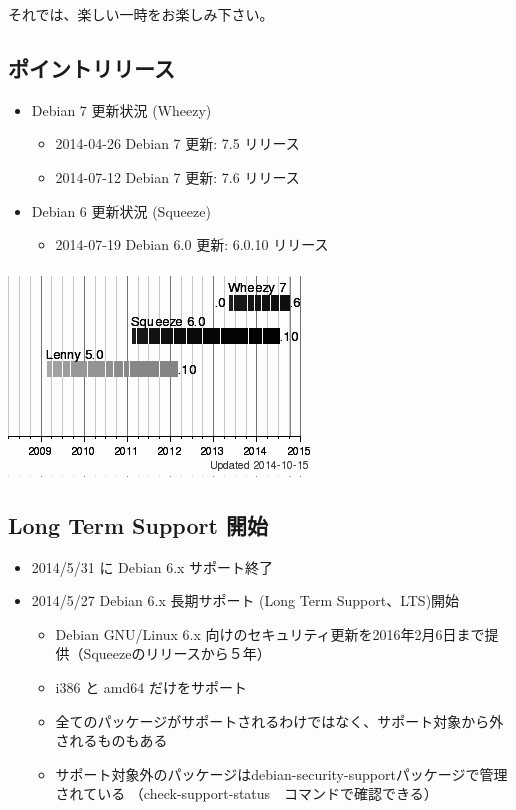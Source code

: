 \documentclass[mingoth,a4paper]{jsarticle}
\begin{document}
 それでは、楽しい一時をお楽しみ下さい。

\subsection{ポイントリリース}

\begin{itemize}
\item Debian 7 更新状況 (Wheezy)
\begin{itemize}
\item 2014-04-26 Debian 7 更新: 7.5 リリース
\item 2014-07-12 Debian 7 更新: 7.6 リリース
\end{itemize}
\item Debian 6 更新状況 (Squeeze)
\begin{itemize}
\item 2014-07-19 Debian 6.0 更新: 6.0.10 リリース
\end{itemize}
\end{itemize}

\begin{center}
\includegraphics[scale=0.7]{image201410/debian-release-201410-cut_mono.png}
\end{center}



\subsection[containsverbatim]{Long Term Support 開始}
\begin{itemize}
\item 2014/5/31 に Debian 6.x サポート終了
\item 2014/5/27 Debian 6.x 長期サポート (Long Term Support、LTS)開始
\begin{itemize}
\item Debian GNU/Linux 6.x
向けのセキュリティ更新を2016年2月6日まで提供（Squeezeのリリースから５年）
\item i386 と amd64 だけをサポート
\item 全てのパッケージがサポートされるわけではなく、サポート対象から外されるものもある
\item サポート対象外のパッケージはdebian-security-supportパッケージで管理されている
（check-support-status　コマンドで確認できる）
\end{itemize}
\end{itemize}
\end{document}
